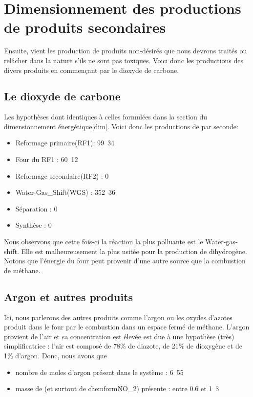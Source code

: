 \section{Dimensionnement des productions de produits secondaires}

Ensuite, vient les production de produits non-désirés que nous devrons traités ou relâcher dans la nature s'ils ne sont pas toxiques. Voici donc les productions des divers produits en commençant par le dioxyde de carbone.

\subsection{Le dioxyde de carbone}

Les hypothèses dont identiques à celles formulées dans la section du dimensionnement énergétique\ref{dim}. Voici donc les productions de  par seconde:

\begin{itemize}
	\item Reformage primaire(RF1): \unit{99.34}{\mole}\\
	\item Four du RF1 : \unit{60.12}{\mole}\\
	\item Reformage secondaire(RF2) : \unit{0}{\mole}\\
	\item Water-Gas_Shift(WGS) : \unit{352.36}{\mole}\\
	\item Séparation : \unit{0}{\mole}\\
	\item Synthèse : \unit{0}{\mole}\\
\end{itemize}

Nous observons que cette fois-ci la réaction la plus polluante est le Water-gas-shift. Elle est malheureusement la plus usitée pour la production de dihydrogène. Notons que l'énergie du four peut provenir d'une autre source que la combustion de méthane.

\subsection{Argon et autres produits}

Ici, nous parlerons des autres produits comme l'argon ou les oxydes d'azotes produit dans le four par le combustion dans un espace fermé de méthane. L'argon provient de l'air et sa concentration est élevée est due à une hypothèse (très) simplificatrice : l'air est composé de 78\% de diazote, de 21\% de dioxygène et de 1\% d'argon. Donc, nous avons que
\begin{itemize}
	\item nombre de moles d'argon présent dans le système : \unit{6.55}{\mole\per\second}
	\item masse de  (et surtout de chemform{NO_2}) présente : entre 0.6 et \unit{1.3}{\ton\per\second}
\end{itemize}

